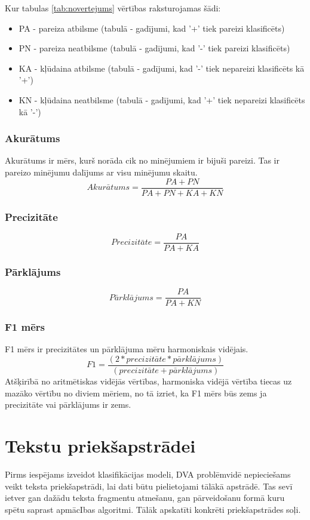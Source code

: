 Kur tabulas  \ref{tab:novertejums} vērtības raksturojamas šādi:
\begin{itemize}
\item PA - pareiza atbilsme (tabulā - gadījumi, kad '+' tiek pareizi klasificēts)
\item PN - pareiza neatbilsme (tabulā - gadījumi, kad '-' tiek pareizi klasificēts)
\item KA - kļūdaina atbilsme (tabulā - gadījumi, kad '-' tiek nepareizi klasificēts kā '+')
\item KN - kļūdaina neatbilsme (tabulā - gadījumi, kad '+' tiek nepareizi klasificēts kā '-')

\end{itemize}
\subsubsection{Akurātums}
Akurātums ir mērs, kurš norāda cik no minējumiem ir bijuši pareizi. Tas ir pareizo minējumu dalījums ar visu minējumu skaitu.
\begin{equation}
Akur\bar{a}tums = \frac{PA + PN}{PA + PN + KA + KN}
\end{equation}
\subsubsection{Precizitāte}
\begin{equation}
Precizit\bar{a}te = \frac{PA}{PA + KA}
\end{equation}
\subsubsection{Pārklājums}
\begin{equation}
P\bar{a}rkl\bar{a}jums = \frac{PA}{PA + KN}
\end{equation}
\subsubsection{F1 mērs}
F1 mērs ir precizitātes un pārklājuma mēru harmoniskais vidējais.
\begin{equation}
F1 = \frac{(2 * precizit\bar{a}te * p\bar{a}rkl\bar{a}jums)}{(precizit\bar{a}te + p\bar{a}rkl\bar{a}jums)}
\end{equation}
Atšķirībā no aritmētiskas vidējās vērtības, harmoniska vidējā vērtība tiecas uz mazāko vērtību no diviem mēriem, no tā izriet, ka F1 mērs būs zems ja precizitāte vai pārklājums ir zems.

\section{Tekstu priekšapstrādei}
Pirms iespējams izveidot klasifikācijas modeli, DVA problēmvidē nepieciešams veikt teksta priekšapstrādi, lai dati būtu pielietojami tālākā apstrādē. Tas sevī ietver gan dažādu teksta fragmentu atmešanu, gan pārveidošanu formā kuru spētu saprast apmācIbas algoritmi. Tālāk apskatīti konkrēti priekšapstrādes soļi.

